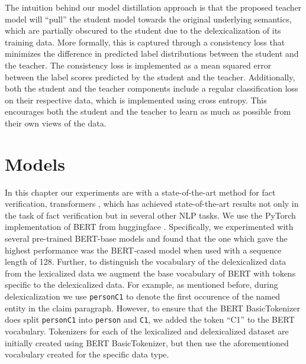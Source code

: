 The intuition behind our model distillation approach is that the proposed teacher model will ``pull'' the student model towards the original underlying semantics, which are partially obscured to the student due to the delexicalization of its training data. More formally, this is captured through a consistency loss that minimizes the difference in predicted label distributions between the student and the teacher. The consistency loss is implemented as a mean squared error between the label scores predicted by the student and the teacher. Additionally, both the student and the teacher components include a regular classification loss on their respective data, which is implemented using cross entropy. This encourages both the student and the teacher to learn as much as possible from their own views of the data.



\section{Models}

In this chapter our experiments are with a state-of-the-art method for fact verification, transformers \citep{vaswani2017attention}, which has achieved state-of-the-art results not only in the task of fact verification but in several other NLP tasks. We use the PyTorch implementation of BERT \cite{devlin-etal-2019-bert} from huggingface \citep{wolf2019huggingface}. Specifically, we experimented with several pre-trained BERT-base models and found that the one which gave the highest performance was the BERT-cased model when used with a sequence length of 128. Further, to distinguish the vocabulary of the delexicalized data from the lexicalized data we augment the base vocabulary of BERT with tokens specific to the delexicalized data. For example, as mentioned before, during delexicalization we use \texttt{personC1} to denote the first occurence of the named entity in the claim paragraph. However, to ensure that the BERT BasicTokenizer does split \texttt{personC1} into \texttt{person}  and \texttt{C1}, we added the token ``C1'' to the BERT vocabulary. Tokenizers for each of the lexicalized and delexicalized dataset are initially created using BERT BasicTokenizer, but then use the aforementioned vocabulary created for the specific data type.




